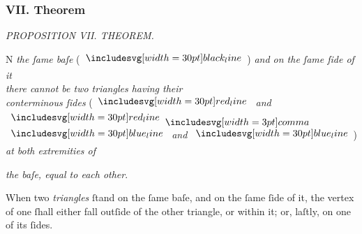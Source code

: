 \documentclass[12pt,preview]{standalone}
\begin{document}
\subsubsection{VII. Theorem}

\begin{minipage}[t]{0.64\textwidth}
    \vspace{0pt}

    \begin{center}
        \textit{PROPOSITION VII. THEOREM.}\label{book1pr7} \\
    \end{center}

    \hfill

    \begin{center}
        \raggedright \lettrine[lines=4, loversize=1, nindent=0pt]{}{}N \textit{the ſame baſe} (\hspace{-1ex}$\blackline$\hspace{-1ex}) \textit{and on the ſame ſide of it\\ there cannot be two triangles having their\\ conterminous ſides} (\hspace{-1ex}$\redline$ \textit{and} $\redline \bcomma$\\ $\blueline$ \textit{and} $\blueline$\hspace{-1ex}) \textit{at both extremities of}\\
    \end{center}
    \textit{the baſe, equal to each other}.

    \hfill

    \hfill

    \raggedright When two \textit{triangles} ſtand on the ſame baſe, and on the ſame ſide of it, the vertex of one ſhall either fall outſide of the other triangle, or within it; or, laſtly, on one of its ſides.

    \hfill


\end{minipage}
\end{document}
